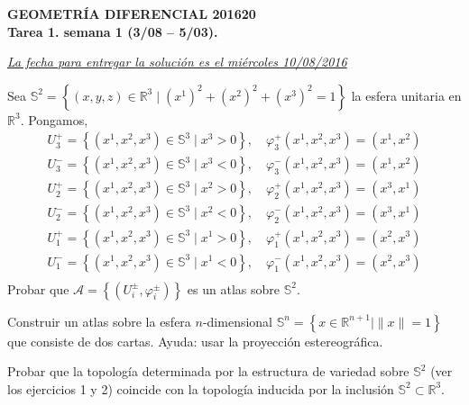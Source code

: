 \documentclass[12pt,answers]{exam}
\begin{document}
\begin{center}
\bf
GEOMETRÍA DIFERENCIAL 201620
\\
Tarea 1.  semana 1 (3/08 -- 5/03).
\end{center}
\bigskip

\underline{\emph{La fecha para entregar la solución es el miércoles  10/08/2016}} 
\bigskip

\begin{questions}

\question[1]
Sea $\mathbb{S}^2 = \left\{ (x, y, z) \in \mathbb{R}^3 \mid (x^1)^2 + (x^2)^2 + (x^3)^2 = 1 \right\}$ la esfera unitaria en $\mathbb{R}^3$. 
Pongamos,
\begin{equation*}
\begin{array}{l}
U_3^+ = \left\{ (x^1, x^2, x^3) \in \mathbb{S}^3 \mid x^3 > 0  \right\}, \quad \varphi_3^+(x^1, x^2, x^3) = (x^1, x^2)
\\
U_3^- = \left\{ (x^1, x^2, x^3) \in \mathbb{S}^3 \mid x^3 < 0  \right\}, \quad \varphi_3^-(x^1, x^2, x^3) = (x^1, x^2)
\\
U_2^+ = \left\{ (x^1, x^2, x^3) \in \mathbb{S}^3 \mid x^2 > 0  \right\}, \quad \varphi_2^+(x^1, x^2, x^3) = (x^3, x^1)
\\
U_2^- = \left\{ (x^1, x^2, x^3) \in \mathbb{S}^3 \mid x^2 < 0  \right\}, \quad \varphi_2^-(x^1, x^2, x^3) = (x^3, x^1)
\\
U_1^+ = \left\{ (x^1, x^2, x^3) \in \mathbb{S}^3 \mid x^1 > 0  \right\}, \quad \varphi_1^+(x^1, x^2, x^3) = (x^2, x^3)
\\ 
U_1^- = \left\{ (x^1, x^2, x^3) \in \mathbb{S}^3 \mid x^1 < 0  \right\}, \quad \varphi_1^-(x^1, x^2, x^3) = (x^2, x^3)
\\
\end{array}
\end{equation*} 
Probar que $\mathcal{A} = \left\{ (U_i^{\pm}, \varphi_i^{\pm}) \right\}$ es un atlas sobre $\mathbb{S}^2$. 



\question[1]
Construir un atlas sobre la esfera $n$-dimensional  $\mathbb{S}^n = \left\{ x \in \mathbb{R}^{n + 1} \mid \| x \| = 1 \right\}$ que consiste de dos cartas. Ayuda: usar la proyección estereográfica.  


\question[1]
Probar que la topología determinada por la estructura de variedad sobre $\mathbb{S}^2$ (ver los ejercicios 1 y 2) coincide con la topología inducida por la inclusión $\mathbb{S}^2 \subset \mathbb{R}^3$.   




\end{questions}
\end{document}
